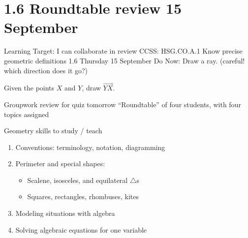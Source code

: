 \section{1.6 Roundtable review \hfill 15 September}
\begin{frame}{Learning Target: I can collaborate in review}
  {CCSS: HSG.CO.A.1 Know precise geometric definitions  \hfill \alert{1.6 Thursday 15 September}}
  Do Now: Draw a ray. (careful! which direction does it go?) \par
  Given the points $X$ and $Y$, draw $\overrightarrow{YX}$.
  \vspace{2cm}
  \begin{center}
  \end{center} \vspace{1cm}
\end{frame}

\begin{frame}{Groupwork review for \alert{quiz tomorrow}}
  {``Roundtable'' of four students, with four topics assigned}
  \begin{block}{Geometry skills to study / teach}
      \begin{enumerate}
    \item Conventions: terminology, notation, diagramming
    \item Perimeter and special shapes: 
    \begin{itemize}
      \item Scalene, isosceles, and equilateral $\triangle$s
      \item Squares, rectangles, rhombuses, kites
    \end{itemize}
    \item Modeling situations with algebra
    \item Solving algebraic equations for one variable
  \end{enumerate}
  \end{block}
\end{frame}

